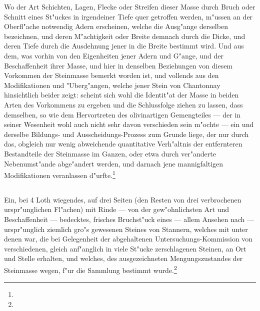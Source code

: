 \documentclass[a4paper, 11pt, oneside, german]{article}
\begin{document}
Wo der Art Schichten, Lagen, Flecke oder Streifen dieser Masse durch Bruch oder Schnitt eines St"uckes in irgendeiner Tiefe quer getroffen werden, m"ussen an der Oberfl"ache notwendig Adern erscheinen, welche die Ausg"ange derselben bezeichnen, und deren M"achtigkeit oder Breite demnach durch die Dicke, und deren Tiefe durch die Ausdehnung jener in die Breite bestimmt wird. Und aus dem, was vorhin von den Eigenheiten jener Adern und G"ange, und der Beschaffenheit ihrer Masse, und hier in denselben Beziehungen von diesem Vorkommen der Steinmasse bemerkt worden ist, und vollends aus den Modifikationen und "Uberg"angen, welche jener Stein von Chantonnay hinsichtlich beider zeigt: scheint sich wohl die Identit"at der Masse in beiden Arten des Vorkommens zu ergeben und die Schlussfolge ziehen zu lassen, dass demselben, so wie dem Hervortreten des olivinartigen Gemengteiles --- der in seiner Wesenheit wohl auch nicht sehr davon verschieden sein m"ochte --- ein und derselbe Bildungs- und Ausscheidungs-Prozess zum Grunde liege, der nur durch das, obgleich nur wenig abweichende quantitative Verh"altnis der entfernteren Bestandteile der Steinmasse im Ganzen, oder etwa durch ver"anderte Nebenumst"ande abge"andert werden, und darnach jene mannigfaltigen Modifikationen veranlassen d"urfte.\footnote{}

\subsection{}
\paragraph{}
Ein, bei 4 Loth wiegendes, auf drei Seiten (den Resten von drei verbrochenen urspr"unglichen Fl"achen) mit Rinde --- von der gew"ohnlichsten Art und Beschaffenheit --- bedecktes, frisches Bruchst"uck eines --- allem Ansehen nach --- urspr"unglich ziemlich gro"s gewesenen Steines von Stannern, welches mit unter denen war, die bei Gelegenheit der abgehaltenen Untersuchungs-Kommission von verschiedenen, gleich anf"anglich in viele St"ucke zerschlagenen Steinen, an Ort und Stelle erhalten, und welches, des ausgezeichneten Mengungszustandes der Steinmasse wegen, f"ur die Sammlung bestimmt wurde.\footnote{}
\end{document}
